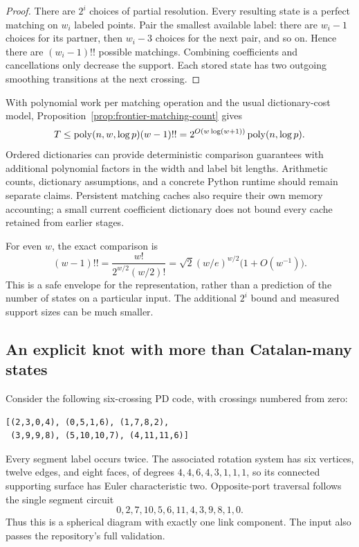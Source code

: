 \begin{proof}
There are $2^i$ choices of partial resolution.  Every resulting state is a
perfect matching on $w_i$ labeled points.  Pair the smallest available label:
there are $w_i-1$ choices for its partner, then $w_i-3$ choices for the next
pair, and so on.  Hence there are $(w_i-1)!!$ possible matchings.  Combining
coefficients and cancellations only decrease the support.  Each stored state
has two outgoing smoothing transitions at the next crossing.
\end{proof}

With polynomial work per matching operation and the usual dictionary-cost
model, Proposition~\ref{prop:frontier-matching-count} gives
\begin{equation}
 T\leq \operatorname{poly}(n,w,\log p)(w-1)!!
   =2^{O(w\log(w+1))}\operatorname{poly}(n,\log p).
 \label{eq:general-frontier-runtime}
\end{equation}
Ordered dictionaries can provide deterministic comparison guarantees with
additional polynomial factors in the width and label bit lengths.  Arithmetic
counts, dictionary assumptions, and a concrete Python runtime should remain
separate claims.  Persistent matching caches also require their own memory
accounting; a small current coefficient dictionary does not bound every cache
retained from earlier stages.

For even $w$, the exact comparison is
\begin{equation}
 (w-1)!!=\frac{w!}{2^{w/2}(w/2)!}
   =\sqrt{2}(w/e)^{w/2}\bigl(1+O(w^{-1})\bigr).
\end{equation}
This is a safe envelope for the representation, rather than a prediction of
the number of states on a particular input.  The additional $2^i$ bound and
measured support sizes can be much smaller.

\subsection{An explicit knot with more than Catalan-many states}

Consider the following six-crossing PD code, with crossings numbered from zero:
\begin{lstlisting}
[(2,3,0,4), (0,5,1,6), (1,7,8,2),
 (3,9,9,8), (5,10,10,7), (4,11,11,6)]
\end{lstlisting}
Every segment label occurs twice.  The associated rotation system has six
vertices, twelve edges, and eight faces, of degrees
$4,4,6,4,3,1,1,1$, so its connected supporting surface has Euler
characteristic two.  Opposite-port traversal follows the single segment circuit
\[
 0,2,7,10,5,6,11,4,3,9,8,1,0.
\]
Thus this is a spherical diagram with exactly one link component.  The input
also passes the repository's full  validation.

